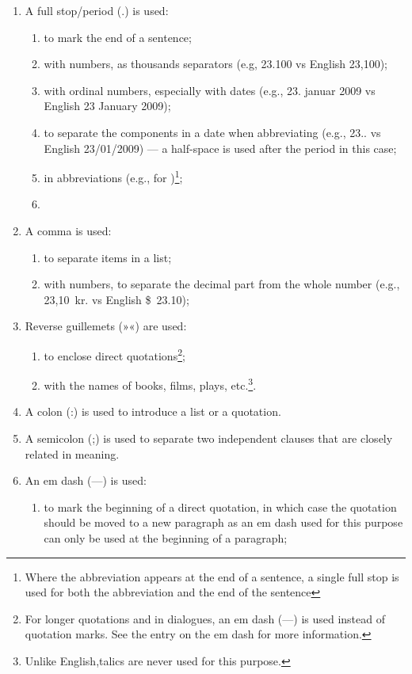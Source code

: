 \begin{enumerate}
	\item A full stop/period (.) is used:
		\begin{enumerate}
			\item to mark the end of a sentence;
			\item with numbers, as thousands separators (e.g, 23.100 vs English 23,100);
			\item with ordinal numbers, especially with dates (e.g., 23. januar 2009 vs English 23 January 2009);
			\item to separate the components in a date when abbreviating (e.g., 23.. vs English 23/01/2009) — a half-space is used after the period in this case;
			\item in abbreviations (e.g.,  for )\footnote{Where the abbreviation appears at the end of a sentence, a single full stop is used for both the abbreviation and the end of the sentence};
			\item 
		\end{enumerate}
	\item A comma is used:
		\begin{enumerate}
			\item to separate items in a list;
			\item with numbers, to separate the decimal part from the whole number (e.g., 23,10~kr. vs English \$~23.10);
		\end{enumerate}
	\item Reverse guillemets (»«) are used:
		\begin{enumerate}
			\item to enclose direct quotations\footnote{For longer quotations and in dialogues, an em dash (—) is used instead of quotation marks. See the entry on the em dash for more information.};
			\item with the names of books, films, plays, etc.\footnote{Unlike English,talics are never used for this purpose.}.
		\end{enumerate}
	\item A colon (:) is used to introduce a list or a quotation.
	\item A semicolon (;) is used to separate two independent clauses that are closely related in meaning.
	\item An em dash (—) is used:
		\begin{enumerate}
			\item to mark the beginning of a direct quotation, in which case the quotation should be moved to a new paragraph as an em dash used for this purpose can only be used at the beginning of a paragraph;

\end{enumerate}
\end{enumerate}
